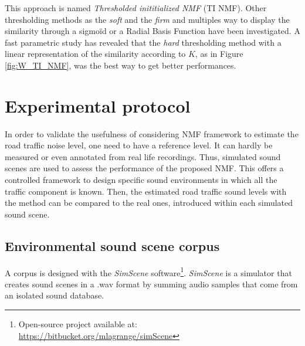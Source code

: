\documentclass[twocolumn,a4paper,10pt]{article}
\begin{document}
This approach is named \textit{Thresholded inititialized NMF} (TI NMF). Other thresholding methods as the \textit{soft} \cite{donoho1995noising} and the \textit{firm} \cite{fornasier2008iterative} and multiples way to display the similarity through a sigmoïd or a Radial Basis Function have been investigated. A fast parametric study has revealed that the \textit{hard} thresholding method  with a linear representation of the similarity according to $K$, as in  Figure \ref{fig:W_TI_NMF}, was the best way to get better performances.

\section{Experimental protocol}\label{part:protocol}

In order to validate the usefulness of considering NMF framework to estimate the road traffic noise level, one need to have a reference level. It can hardly be measured or even annotated from real life recordings. Thus,  simulated sound scenes are used to assess the performance of the proposed NMF. This offers a controlled framework to design specific sound environments in which all the traffic component is known. Then, the estimated road traffic sound levels with the method can be compared to the real ones, introduced within each simulated sound scene.

\subsection{Environmental sound scene corpus}

A corpus is designed with the \textit{SimScene} software\footnote{Open-source project available at: \url{https://bitbucket.org/mlagrange/simScene}}. \textit{SimScene} \cite{rossignol_simscene:_2015} is a simulator that creates sound scenes in a .wav format by summing audio samples that come from an isolated sound database.
\end{document}
